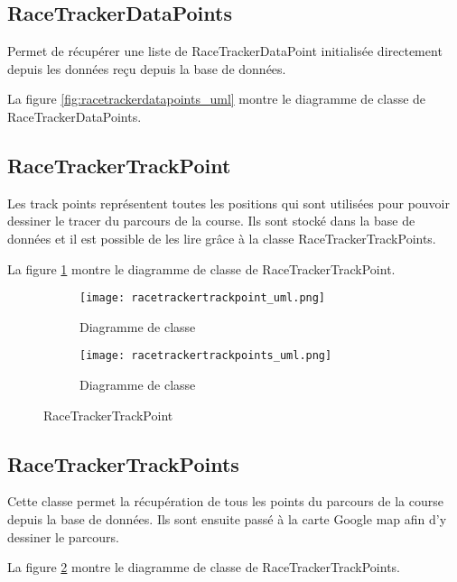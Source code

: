 \subsection{RaceTrackerDataPoints}

Permet de récupérer une liste de RaceTrackerDataPoint initialisée directement depuis les données reçu depuis la base de données.

La figure \ref{fig:racetrackerdatapoints_uml} montre le diagramme de classe de RaceTrackerDataPoints.

\subsection{RaceTrackerTrackPoint}

Les track points représentent toutes les positions qui sont utilisées pour pouvoir dessiner le tracer du parcours de la course. Ils sont stocké dans la base de données et il est possible de les lire grâce à la classe RaceTrackerTrackPoints.

La figure \ref{fig:racetrackertrackpoint_uml} montre le diagramme de classe de RaceTrackerTrackPoint.
 
 \begin{figure}[htb!]
    \centering
    \begin{subfigure}[htb]{1\textwidth}
		\texttt{[image: racetrackertrackpoint\_uml.png]} 
		\caption{Diagramme de classe}
		\label{fig:racetrackertrackpoint_uml}
    \end{subfigure}
    \begin{subfigure}[htb]{1\textwidth}
		\texttt{[image: racetrackertrackpoints\_uml.png]} 
		\caption{Diagramme de classe}
		\label{fig:racetrackertrackpoints_uml}
    \end{subfigure}
    \caption{RaceTrackerTrackPoint}\label{fig:racetrackertrackpoint_fig}
\end{figure}

\subsection{RaceTrackerTrackPoints}

Cette classe permet la récupération de tous les points du parcours de la course depuis la base de données. Ils sont ensuite passé à la carte Google map afin d'y dessiner le parcours.

La figure \ref{fig:racetrackertrackpoints_uml} montre le diagramme de classe de RaceTrackerTrackPoints.

